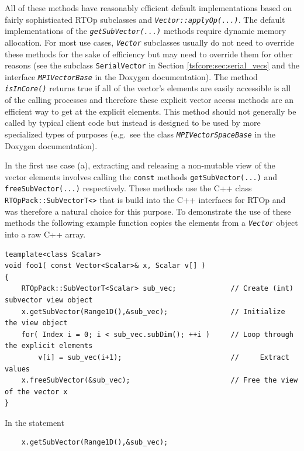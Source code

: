\noindent All of these methods have reasonably efficient default implementations
based on fairly sophisticated RTOp subclasses and
\texttt{\textit{Vector::applyOp(\-...)}}.  The default implementations of the
\texttt{\textit{getSubVector(...)}} methods require dynamic memory allocation.
For most use cases, \texttt{\textit{Vector}} subclasses usually do not
need to override these methods for the sake of efficiency but may need
to override them for other reasons (see the subclass
\texttt{SerialVector} in Section \ref{tsfcore:sec:serial_vecs} and
the interface \texttt{\textit{MPI\-Vector\-Base}} in the Doxygen
documentation).  The method \texttt{\textit{isInCore()}} returns true
if all of the vector's elements are easily accessible is all of the
calling processes and therefore these explicit vector access methods
are an efficient way to get at the explicit elements.  This method
should not generally be called by typical client code but instead is
designed to be used by more specialized types of purposes (e.g.~see the
class \texttt{\textit{MPI\-Vector\-Space\-Base}} in the Doxygen
documentation).

In the first use case (a), extracting and releasing a non-mutable view of the
vector elements involves calling the \texttt{const} methods
\texttt{getSubVector(...)} and
\texttt{freeSubVector(...)} respectively.  These methods use the C++ class
\texttt{RTOpPack::\-SubVectorT<>} that is build into the C++ interfaces for RTOp
and was therefore a natural choice for this purpose.  To demonstrate
the use of these methods the following example function copies the
elements from a \texttt{\textit{Vector}} object into a raw C++ array.

{\scriptsize\begin{verbatim}
teamplate<class Scalar>
void foo1( const Vector<Scalar>& x, Scalar v[] )
{
    RTOpPack::SubVectorT<Scalar> sub_vec;             // Create (int) subvector view object
    x.getSubVector(Range1D(),&sub_vec);               // Initialize the view object
    for( Index i = 0; i < sub_vec.subDim(); ++i )     // Loop through the explicit elements
        v[i] = sub_vec(i+1);                          //     Extract values
    x.freeSubVector(&sub_vec);                        // Free the view of the vector x
}
\end{verbatim}}

\noindent In the statement

{\scriptsize\begin{verbatim}
    x.getSubVector(Range1D(),&sub_vec);
\end{verbatim}}

